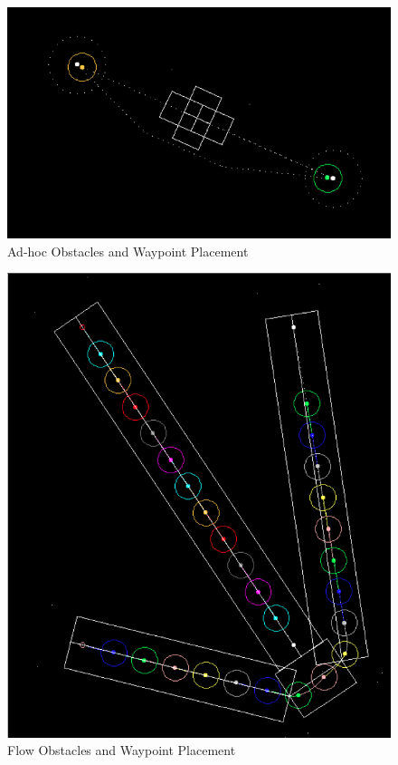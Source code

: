 \documentclass[10pt]{article}
\begin{document}
\begin{figure}[h!]
  \includegraphics[width=150mm]{wp.png}
  \caption{Ad-hoc Obstacles and Waypoint Placement}
\label{fig:wp}
\end{figure}

\begin{figure}[h!]
  \includegraphics[width=150mm]{diagonal_flows.png}
  \caption{Flow Obstacles and Waypoint Placement}
\label{fig:diagonal_flows}
\end{figure}
\end{document}
